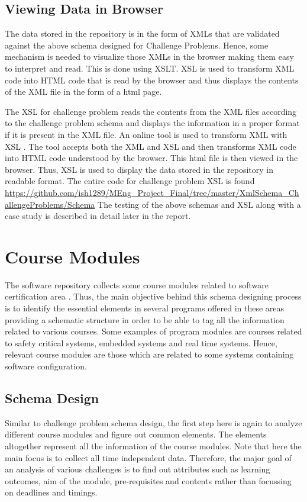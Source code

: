\documentclass[11pt,letterpaper]{report}
\begin{document}
\section{Viewing Data in Browser}
The data stored in the repository is in the form of XMLs that are validated against the above schema designed for Challenge Problems. Hence, some mechanism is needed to visualize those XMLs in the browser making them easy to interpret and read. This is done using XSLT. XSL is used to transform XML code into HTML code that is read by the browser and thus displays the contents of the XML file in the form of a html page. 

The XSL for challenge problem reads the contents from the XML files according to the challenge problem schema and displays the information in a proper format if it is present in the XML file. An online tool is used to transform XML with XSL \cite{olXSL}. The tool accepts both the XML and XSL and then transforms XML code into HTML code understood by the browser. This html file is then viewed in the browser. Thus, XSL is used to display the data stored in the repository in readable format. The entire code for challenge problem XSL is found \url{https://github.com/ish1289/MEng_Project_Final/tree/master/XmlSchema_ChallengeProblems/Schema}
\bigskip
The testing of the above schemas and XSL along with a case study is described in detail later in the report. 

\chapter{Course Modules}
The software repository collects some course modules related to software certification area \cite{York,Waterloo, MaC,Victoria}. Thus, the main objective behind this schema designing process is to identify the essential elements in several programs offered in these areas providing a schematic structure in order to be able to tag all the information related to various courses. Some examples of program modules are courses related to safety critical systems, embedded systems and real time systems. Hence, relevant course modules are  those which are related to some systems containing software configuration.

\section{Schema Design}
Similar to challenge problem schema design, the first step here is again to analyze different course modules and figure out common elements. The elements altogether represent all the information of the course modules. Note that here the main focus is to collect all time independent data. Therefore, the major goal of an analysis of various challenges is to find out attributes such as learning outcomes, aim of the module, pre-requisites and contents rather than focussing on deadlines and timings.  
\end{document}
